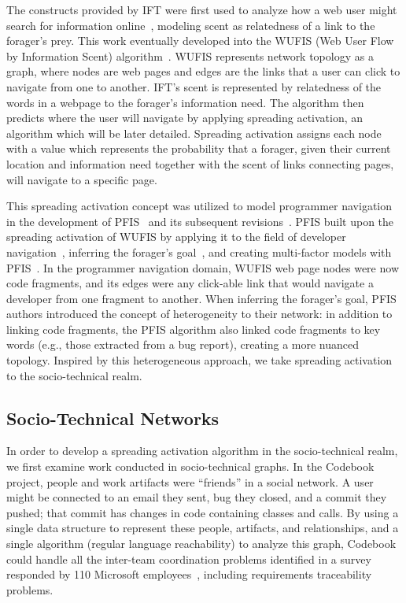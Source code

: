 \documentclass[conference]{IEEEtran}
\begin{document}
The constructs provided by IFT were first used to analyze how a web user might search for information online~\cite{pirolliWeb}, modeling scent as relatedness of a link to the forager's prey. This work eventually developed into the WUFIS (Web User Flow by Information Scent) algorithm~\cite{wufis}. WUFIS represents network topology as a graph, where nodes are web pages and edges are the links that a user can click to navigate from one to another. IFT's scent is represented by relatedness of the words in a webpage to the forager's information need. The algorithm then predicts where the user will navigate by applying spreading activation, an algorithm which will be later detailed. Spreading activation assigns each node with a value which represents the probability that a forager, given their current location and information need together with the scent of links connecting pages, will navigate to a specific page.

This spreading activation concept was utilized to model programmer navigation in the development of PFIS~\cite{pfis1a} and its subsequent revisions~\cite{pfis2,pfis3a}. PFIS built upon the spreading activation of WUFIS by applying it to the field of developer navigation~\cite{pfis1a}, inferring the forager's goal~\cite{pfis2}, and creating multi-factor models with PFIS~\cite{pfis3a}. In the programmer navigation domain, WUFIS web page nodes were now code fragments, and its edges were any click-able link that would navigate a developer from one fragment to another. When inferring the forager's goal, PFIS authors introduced the concept of heterogeneity to their network: in addition to linking code fragments, the PFIS algorithm also linked code fragments to key words (e.g., those extracted from a bug report), creating a more nuanced topology. Inspired by this heterogeneous approach, we take spreading activation to the socio-technical realm.

\subsection{Socio-Technical Networks}
In order to develop a spreading activation algorithm in the socio-technical realm, we first examine work conducted in socio-technical graphs. In the Codebook~\cite{codebook} project, people and work artifacts were ``friends'' in a social network. A user might be connected to an email they sent, bug they closed, and a commit they pushed; that commit has changes in code containing classes and calls. By using a single data structure to represent these people, artifacts, and relationships, and a single algorithm (regular language reachability) to analyze this graph, Codebook could handle all the inter-team coordination problems identified in a survey responded by 110 Microsoft employees~\cite{codebook10}, including requirements traceability problems. 
\end{document}
